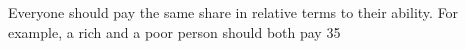 Everyone should pay the same share in relative terms to their ability. For example, a rich and a poor person should both pay 35%
